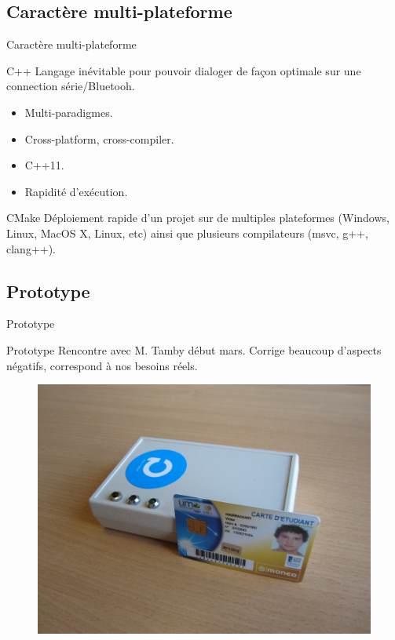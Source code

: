 \subsection{Caractère multi-plateforme}
\begin{frame}{Caractère multi-plateforme}
	\begin{block}{C++}
        Langage inévitable pour pouvoir dialoger de façon optimale sur une connection
        série/Bluetooh.

	    \begin{itemize}
            \item Multi-paradigmes.
            \item Cross-platform, cross-compiler.
            \item C++11.
            \item Rapidité d'exécution.
	    \end{itemize}
	\end{block}

	\begin{block}{CMake}
        Déploiement rapide d'un projet sur de multiples plateformes (Windows, Linux,
    MacOS X, Linux, etc) ainsi que plusieurs compilateurs (msvc, g++, clang++).
	\end{block}
\end{frame}


\subsection{Prototype}
\begin{frame}{Prototype}
	\begin{block}{Prototype}
        Rencontre avec M. Tamby début mars. Corrige beaucoup d'aspects négatifs,
        correspond à nos besoins réels.
	\end{block}

    \begin{figure}[h]
        \begin{center}
            \includegraphics[scale=0.4]{images/proto.jpg} 
        \end{center}
     \end{figure} 
\end{frame}

